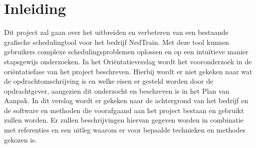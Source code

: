 \section{Inleiding}
Dit project zal gaan over het uitbreiden en verbeteren van een bestaande grafische schedulingtool
voor het bedrijf NedTrain. Met deze tool kunnen gebruikers complexe schedulingsproblemen
oplossen en op een intu\"itieve manier stapsgewijs onderzoeken. In het Ori\"entatieverslag wordt het vooronderzoek in de ori\"entatiefase van het project beschreven. Hierbij wordt er niet gekeken naar wat de opdrachtomschrijving is en welke eisen er gesteld worden door de opdrachtgever, aangezien dit onderzocht en beschreven is in het Plan van Aanpak. In dit verslag wordt er gekeken naar de achtergrond van het bedrijf en de software en methoden die voorafgaand aan het project bestaan en gebruikt zullen worden. Er zullen beschrijvingen hiervan gegeven worden in combinatie met referenties en een uitleg waarom er voor bepaalde technieken en methodes gekozen is.